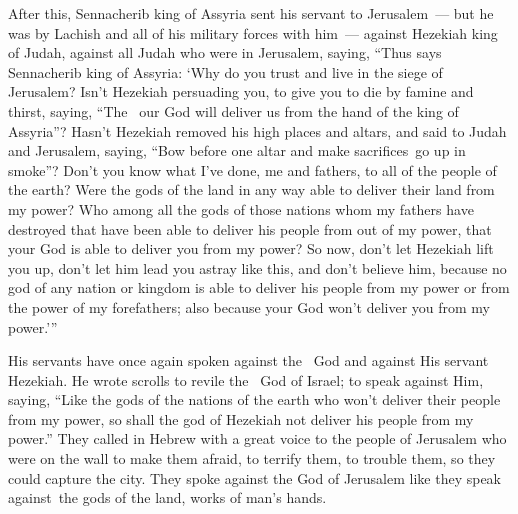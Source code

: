 \begin{inparaenum}
   After this, Sennacherib king of Assyria sent his servant to Jerusalem~--- but he was by Lachish and all of his military forces with him~--- against Hezekiah king of Judah, against all Judah who were in Jerusalem, saying,%
   ``Thus says Sennacherib king of Assyria: `Why do you trust and live in the siege of Jerusalem?%
   Isn't Hezekiah persuading you, to give you to die by famine and thirst, saying, ``The \lord\ our God will deliver us from the hand of the king of Assyria''?%
   Hasn't Hezekiah removed his high places and altars, and said to Judah and Jerusalem, saying, ``Bow before one altar and make sacrifices\understood\ go up in smoke''?%
   Don't you know what I've done, me and fathers, to all of the people of the earth? Were the gods of the land in any way able to deliver their land from my power?%
   Who among all the gods of those nations whom my fathers have destroyed that have been able to deliver his people from out of my power, that your God is able to deliver you from my power?%
   So now, don't let Hezekiah lift you up, don't let him lead you astray like this, and don't believe him, because no god of any nation or kingdom is able to deliver his people from my power or from the power of my forefathers; also because your God won't deliver you from my power.'\thinspace''%
  
   His servants have once again spoken against the \lord\ God and against His servant Hezekiah.%
   He wrote scrolls to revile the \lord\ God of Israel; to speak against Him, saying, ``Like the gods of the nations of the earth who won't deliver their people from my power, so shall the god of Hezekiah not deliver his people from my power.''%
   They called in Hebrew with a great voice to the people of Jerusalem who were on the wall to make them afraid, to terrify them, to trouble them, so they could capture the city.%
   They spoke against the God of Jerusalem like they speak against\understood\ the gods of the land, works of man's hands.%
  

\end{inparaenum}
